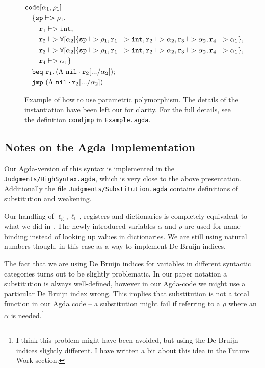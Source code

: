 \begin{figure}
\begin{align*}
&\mathtt{code}[ \alpha_1, \rho_1 ]\\
&\ \ \ \{\mathtt{sp} |-> \rho_1, \\
&\ \ \ \ \ \ \mathtt{r}_1 |-> \mathtt{int},\\
&\ \ \ \ \ \ \mathtt{r}_2 |-> \forall[\alpha_2] \{\mathtt{sp} |-> \rho_1, \mathtt{r}_1 |-> \mathtt{int}, \mathtt{r}_2 |-> \alpha_2, \mathtt{r}_3 |-> \alpha_2, \mathtt{r}_4 |-> \alpha_1\},\\
&\ \ \ \ \ \ \mathtt{r}_3 |-> \forall[\alpha_2] \{\mathtt{sp} |-> \rho_1, \mathtt{r}_1 |-> \mathtt{int}, \mathtt{r}_2 |-> \alpha_2, \mathtt{r}_3 |-> \alpha_2, \mathtt{r}_4 |-> \alpha_1\},\\
&\ \ \ \ \ \ \mathtt{r}_4 |-> \alpha_1\} \\
&\ \ \ \mathtt{beq}\ \mathtt{r}_1, (\Lambda\ \mathtt{nil} \cdot \mathtt{r}_2 [... / \alpha_2]) ; \\
&\ \ \ \mathtt{jmp}\ (\Lambda\ \mathtt{nil} \cdot \mathtt{r}_2 [... / \alpha_2])
\end{align*}
\caption{Example of how to use parametric polymorphism. The details of the
  instantiation have been left our for clarity. For the full details, see the
  definition \texttt{condjmp} in \texttt{Example.agda}.}
\label{fig:parexample}
\end{figure}

\subsection{Notes on the Agda Implementation}

Our Agda-version of this syntax is implemented in the
\texttt{Judgments/HighSyntax.agda}, which is very close to the above
presentation. Additionally the file \texttt{Judgments/Substitution.agda}
contains definitions of substitution and weakening.

Our handling of $\ell_{\mathrm{g}}, \ell_{\mathrm{h}}$, registers and
dictionaries is completely equivalent to what we did in \ATALe. The newly
introduced variables $\alpha$ and $\rho$ are used for name-binding instead of
looking up values in dictionaries. We are still using natural numbers though, in
this case as a way to implement De Bruijn indices.

The fact that we are using De Bruijn indices for variables in different
syntactic categories turns out to be slightly problematic. In our paper notation
a substitution is always well-defined, however in our Agda-code we might use a
particular De Bruijn index wrong. This implies that substitution is not a total
function in our Agda code -- a substitution might fail if referring to a $\rho$
where an $\alpha$ is needed.\footnote{I think this problem might have been
  avoided, but using the De Bruijn indices slightly different. I have written a
  bit about this idea in the Future Work section.}

